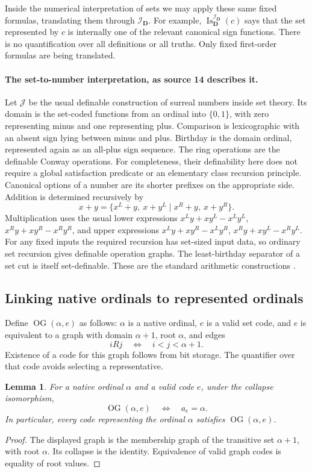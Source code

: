\documentclass[11pt,letterpaper]{article}
\newtheorem{lemma}[lemma]{Lemma}\aliascntresetthe{lemma}
\theoremstyle{definition}
\theoremstyle{remark}
\newcommand{\I}{\mathcal I}
\newcommand{\J}{\mathcal J}
\newcommand{\OG}{\operatorname{OG}}
\newcommand{\Dd}{\mathbf{D}}
\begin{document}
Inside the numerical interpretation of sets we may apply these same fixed
formulas, translating them through $\I_{\Dd}$. For example,
$\operatorname{Is}_{\Dd}^{\I_{\Dd}}(c)$ says that the set represented by $c$ is
internally one of the relevant canonical sign functions. There is no
quantification over all definitions or all truths. Only fixed first-order
formulas are being translated.

\paragraph{The set-to-number interpretation, as source 14 describes it.} Let $\J$
be the usual definable construction of surreal numbers inside set theory. Its
domain is the set-coded functions from an ordinal into $\{0,1\}$, with zero
representing minus and one representing plus. Comparison is lexicographic with an
absent sign lying between minus and plus. Birthday is the domain ordinal,
represented again as an all-plus sign sequence. The ring operations are the
definable Conway operations. For completeness, their definability here does not
require a global satisfaction predicate or an elementary class recursion
principle. Canonical options of a number are its shorter prefixes on the
appropriate side. Addition is determined recursively by
\[
 x+y=\{x^L+y,\ x+y^L\mid x^R+y,\ x+y^R\}.
\]
Multiplication uses the usual lower expressions $x^Ly+xy^L-x^Ly^L$,
$x^Ry+xy^R-x^Ry^R$, and upper expressions $x^Ly+xy^R-x^Ly^R$,
$x^Ry+xy^L-x^Ry^L$. For any fixed inputs the required recursion has set-sized
input data, so ordinary set recursion gives definable operation graphs. The
least-birthday separator of a set cut is itself set-definable. These are the
standard arithmetic constructions \cite{Conway,Gonshor}.

\subsection{Linking native ordinals to represented ordinals}

Define $\OG(\alpha,e)$ as follows: $\alpha$ is a native ordinal, $e$ is a valid
set code, and $e$ is equivalent to a graph with domain $\alpha+1$, root $\alpha$,
and edges
\[
 iRj\quad\Longleftrightarrow\quad i<j<\alpha+1.
\]
Existence of a code for this graph follows from bit storage. The quantifier over
that code avoids selecting a representative.

\begin{lemma}\label{hset:sf:lem:og}
For a native ordinal $\alpha$ and a valid code $e$, under the collapse
isomorphism,
\[
 \OG(\alpha,e)\quad\Longleftrightarrow\quad a_e=\alpha.
\]
In particular, every code representing the ordinal $\alpha$ satisfies
$\OG(\alpha,e)$.
\end{lemma}
\begin{proof}
The displayed graph is the membership graph of the transitive set $\alpha+1$, with
root $\alpha$. Its collapse is the identity. Equivalence of valid graph codes is
equality of root values.
\end{proof}
\end{document}
